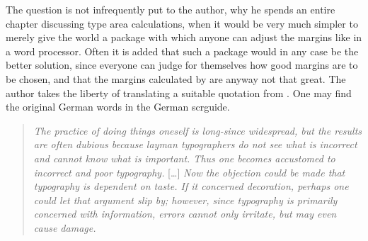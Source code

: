 The question is not infrequently put to the author, why he spends an
entire chapter discussing type area calculations, when it would be
very much simpler to merely give the world a package with which anyone
can adjust the margins like in a word processor.  Often it is added
that such a package would in any case be the better solution, since
everyone can judge for themselves how good margins are to be chosen,
and that the margins calculated by {\KOMAScript} are anyway not that
great.  The author takes the liberty of translating a suitable
quotation from \cite{TYPO:ErsteHilfe}. One may find the original
German words in the German scrguide.

\begin{quote}
  \textit{The practice of doing things oneself is long-since
    widespread, but the results are often dubious because layman
    typographers do not see what is incorrect and cannot know what is
    important. Thus one becomes accustomed to incorrect and poor
    typography.} [\dots] \textit{Now the objection could be made that
    typography is dependent on taste. If it concerned decoration,
    perhaps one could let that argument slip by; however, since
    typography is primarily concerned with information, errors cannot
    only irritate, but may even cause damage.}
\end{quote}
%
\EndIndexGroup

